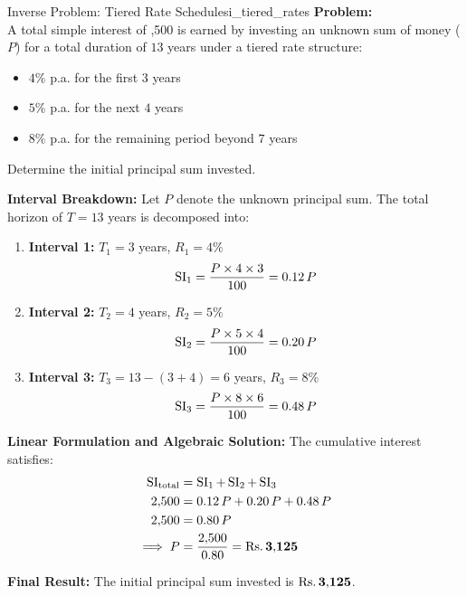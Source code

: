 \begin{example}{Inverse Problem: Tiered Rate Schedule}{si_tiered_rates}
\textbf{Problem:} \\
A total simple interest of ,500 is earned by investing an unknown sum of money ($P$) for a total duration of $13$ years under a tiered rate structure:
\begin{itemize}[noitemsep]
    \item $4\%$ p.a. for the first $3$ years
    \item $5\%$ p.a. for the next $4$ years
    \item $8\%$ p.a. for the remaining period beyond $7$ years
\end{itemize}
Determine the initial principal sum invested.

\tcbline
\textbf{Interval Breakdown:}
Let $P$ denote the unknown principal sum. The total horizon of $T = 13$ years is decomposed into:
\begin{enumerate}[leftmargin=*]
    \item \textbf{Interval 1:} $T_1 = 3$ years, $R_1 = 4\%$
    \begin{equation*}
        \operatorname{SI}_1 = \frac{P \times 4 \times 3}{100} = 0.12\,P
    \end{equation*}
    \item \textbf{Interval 2:} $T_2 = 4$ years, $R_2 = 5\%$
    \begin{equation*}
        \operatorname{SI}_2 = \frac{P \times 5 \times 4}{100} = 0.20\,P
    \end{equation*}
    \item \textbf{Interval 3:} $T_3 = 13 - (3 + 4) = 6$ years, $R_3 = 8\%$
    \begin{equation*}
        \operatorname{SI}_3 = \frac{P \times 8 \times 6}{100} = 0.48\,P
    \end{equation*}
\end{enumerate}

\textbf{Linear Formulation and Algebraic Solution:}
The cumulative interest satisfies:
\begin{align*}
    \operatorname{SI}_{\text{total}} &= \operatorname{SI}_1 + \operatorname{SI}_2 + \operatorname{SI}_3 \\
    2{,}500 &= 0.12\,P + 0.20\,P + 0.48\,P \\
    2{,}500 &= 0.80\,P \\
    \implies P &= \frac{2{,}500}{0.80} = \mathbf{\text{Rs.}\, 3{,}125}
\end{align*}

\textbf{Final Result:}
The initial principal sum invested is $\mathbf{\text{Rs.}\, 3{,}125}$.
\end{example}

